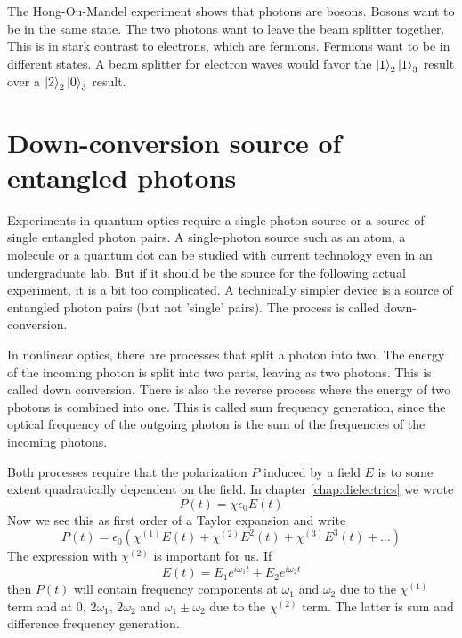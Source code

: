 The Hong-Ou-Mandel experiment shows that photons are bosons. Bosons want to be in the same state. The two photons want to leave the beam splitter together. This is in stark contrast to electrons, which are fermions. Fermions want to be in different states. A beam splitter for electron waves would favor the $\ket{1}_2\ket{1}_3$ result over a $\ket{2}_2\ket{0}_3$ result.



\section{Down-conversion source of entangled photons}

Experiments in quantum optics require a single-photon source or a source of single entangled photon pairs. A single-photon source such as an atom, a molecule or a quantum dot can be studied with current technology even in an undergraduate lab. But if it should be the source for the following actual experiment, it is a bit too complicated. A technically simpler device is a source of entangled photon pairs (but not 'single' pairs). The process is called down-conversion.

In nonlinear optics, there are processes that split a photon into two. The energy of the incoming photon is split into two parts, leaving as two photons. This is called down conversion. There is also the reverse process where the energy of two photons is combined into one. This is called sum frequency generation, since the optical frequency of the outgoing photon is the sum of the frequencies of the incoming photons.


Both processes require that the polarization $P$ induced by a field $E$ is to some extent quadratically dependent on the field. In chapter \ref{chap:dielectrics} we wrote 
\begin{equation}
    P(t) =  \chi \epsilon_0 E(t) 
\end{equation}
Now we see this as first order of a Taylor expansion and write 
\begin{equation}
    P(t) =  \epsilon_0 \left( \chi^{(1)} E(t) +  \chi^{(2)} E^2(t)   +  \chi^{(3)} E^3(t)  + \dots \right)
\end{equation}
The expression with $\chi^{(2)}$ is important for us. If 
\begin{equation}
    E(t) = E_1 e^{i \omega_1 t} + E_2 e^{i \omega_2 t}
\end{equation}
then $P(t)$ will contain frequency components at $\omega_1$ and $\omega_2$ due to the $\chi^{(1)}$ term and at 0, $2\omega_1$, $2\omega_2$ and $\omega_1 \pm \omega_2$ due to the $\chi^{(2)}$ term. The latter is sum and difference frequency generation.

